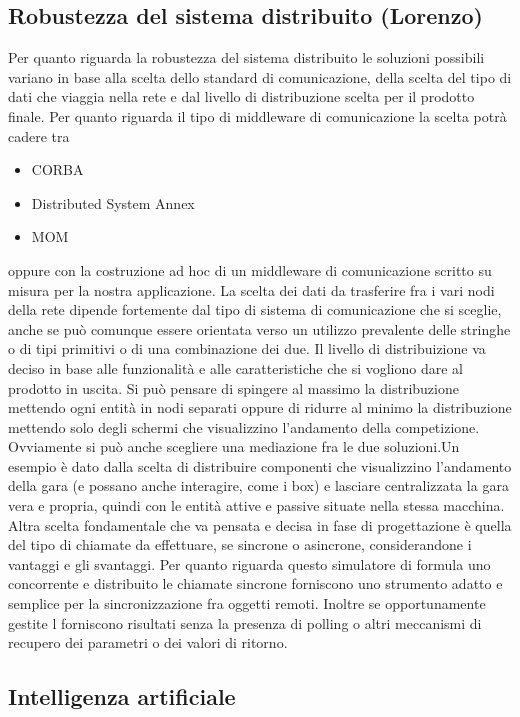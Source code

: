 \subsection{Robustezza del sistema distribuito (Lorenzo)}
Per quanto riguarda la robustezza del sistema distribuito le soluzioni possibili variano in base alla scelta dello standard di comunicazione, della scelta del tipo di dati che viaggia nella rete e dal livello di distribuzione scelta per il prodotto finale.
Per quanto riguarda il tipo di middleware di comunicazione la scelta potr\`{a} cadere tra 
\begin{itemize}
\item CORBA
\item Distributed System Annex 
\item MOM
\end{itemize}
oppure con la costruzione ad hoc di un middleware di comunicazione scritto su misura per la nostra applicazione.
La scelta dei dati da trasferire fra i vari nodi della rete dipende fortemente dal tipo di sistema di comunicazione che si sceglie, anche se può comunque essere orientata verso un utilizzo prevalente delle stringhe o di tipi primitivi o di una combinazione dei due. Il livello di distribuizione va deciso in base alle funzionalit\`{a} e alle caratteristiche che si vogliono dare al prodotto in uscita. Si può pensare di spingere al massimo la distribuzione mettendo ogni entit\`{a} in nodi separati oppure di ridurre al minimo la distribuzione mettendo solo degli schermi che visualizzino l'andamento della competizione. Ovviamente si pu\`{o} anche scegliere una mediazione fra le due soluzioni.Un esempio \`{e} dato dalla scelta di distribuire componenti che visualizzino l'andamento della gara (e possano anche interagire, come i box) e lasciare centralizzata la gara vera e propria, quindi con le entit\`{a} attive e passive situate nella stessa macchina. Altra scelta fondamentale che va pensata e decisa in fase di progettazione \`{e} quella del tipo di chiamate da effettuare, se sincrone o asincrone, considerandone i vantaggi e gli svantaggi. Per quanto riguarda questo simulatore di formula uno concorrente e distribuito le chiamate sincrone forniscono uno strumento adatto e semplice per la sincronizzazione fra oggetti remoti. Inoltre se opportunamente gestite l forniscono risultati senza la presenza di polling o altri meccanismi di recupero dei parametri o dei valori di ritorno.
\subsection{Intelligenza artificiale}
